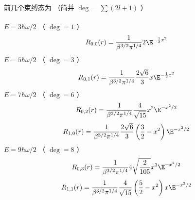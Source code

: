 前几个束缚态为 （简并 $\deg  = \sum {(2l + 1)} $ ）\\ \\
 $E = 3\hbar \omega /2$ （ $\deg  = 1$ ）
\begin{equation}
{R_{0,0}}(r) = \frac{1}{{\beta ^{3/2}}{\pi ^{1/4}}}2{\E^{ - \frac12 {x^2}}}
\end{equation}
 $E = 5\hbar \omega /2$ （ $\deg  = 3$ ）
\begin{equation}
{R_{0,1}}(r) = \frac{1}{{\beta ^{3/2}}{\pi ^{1/4}}}\frac{2\sqrt 6 }{3}x{\E^{ - \frac12 {x^2}}}
\end{equation}
 $E = 7\hbar \omega /2$ （ $\deg  = 6$ ）
\begin{equation}
{R_{0,2}}(r) = \frac{1}{{\beta ^{3/2}}{\pi ^{1/4}}}\frac{4}{\sqrt {15} }{x^2}{\E^{ - {x^2}/2}}
\end{equation}
\begin{equation}
{R_{1,0}}(r) = \frac{1}{{\beta ^{3/2}}{\pi ^{1/4}}}\frac{2\sqrt 6 }{3}\left( {\frac{3}{2} - {x^2}} \right){\E^{ - {x^2}/2}}
\end{equation}
 $E = 9\hbar \omega /2$ （ $\deg  = 8$ ）
\begin{equation}
 {R_{0,3}}(r) = \frac{1}{{\beta ^{3/2}}{\pi ^{1/4}}}4\sqrt {\frac{2}{105}} {x^3}{\E^{ - {x^2}/2}}
\end{equation}
\begin{equation}
{R_{1,1}}(r) = \frac{1}{{\beta ^{3/2}}{\pi ^{1/4}}}\frac{4}{\sqrt {15} }\left( {\frac{5}{2} - {x^2}} \right)x{\E^{ - {x^2}/2}}
\end{equation}

 
